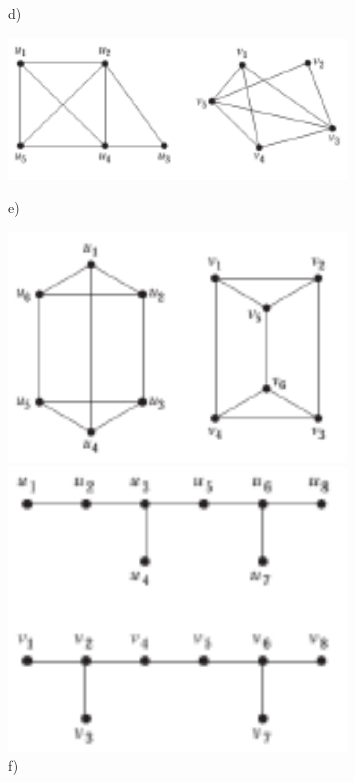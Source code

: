 \documentclass[12pt,en,a4paper]{article}
\begin{document}
\begin{figure}[ht]
\begin{minipage}{0.5\textwidth}
			\caption*{d)}
			\label{fig:gprob4_4}
		\end{minipage}
		\begin{minipage}{0.5\textwidth}
			\includegraphics[width=0.8\textwidth]{gprob4_5.png}
			\caption*{e)}
			\label{fig:gprob4_5}
		\end{minipage}
		\begin{minipage}{0.5\textwidth}
			\includegraphics[width=0.8\textwidth]{gprob4_6.png}
			\caption*{f)}
			\label{fig:gprob4_6}
		\end{minipage}
		\begin{minipage}{0.5\textwidth}
			\includegraphics[width=0.8\textwidth]{gprob4_7.png}

\end{minipage}
\end{figure}
\end{document}
